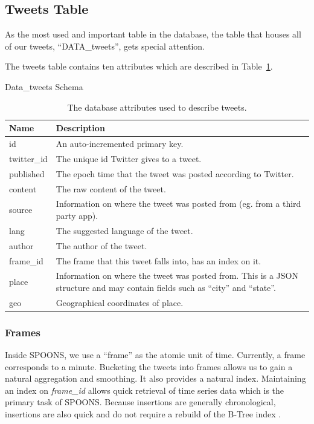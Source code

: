 \documentclass[12pt]{ucthesis}
\begin{document}
\subsection{Tweets Table}
\label{arch-database-tables-tweets}
As the most used and important table in the database, the table that houses all of our tweets, ``DATA\_tweets'', gets special attention.

The tweets table contains ten attributes which are described in Table~\ref{table:tweet-attributes}.

\begin{table}
   \begin{center}
      {\Large Data\_tweets Schema}
      \begin{tabular}{|l|p{12cm}|}
         \hline
            Name & Description
         \tabularnewline\hline
            \textsf{id} & An auto-incremented primary key.
         \tabularnewline\hline
            \textsf{twitter\_id} & The unique id Twitter gives to a tweet.
         \tabularnewline\hline
            \textsf{published} & The epoch time that the tweet was posted according to Twitter.
         \tabularnewline\hline
            \textsf{content} & The raw content of the tweet.
         \tabularnewline\hline
            \textsf{source} & Information on where the tweet was posted from (eg. from a third party app).
         \tabularnewline\hline
            \textsf{lang} & The suggested language of the tweet.
         \tabularnewline\hline
            \textsf{author} & The author of the tweet.
         \tabularnewline\hline
            \textsf{frame\_id} & The frame that this tweet falls into, has an index on it.
         \tabularnewline\hline
            \textsf{place} & Information on where the tweet was posted from. This is a JSON structure and may contain fields such as ``city'' and ``state''.
         \tabularnewline\hline
            \textsf{geo} & Geographical coordinates of place.
         \tabularnewline\hline
      \end{tabular}
   \end{center}
   \caption[Database Tweet Attributes]{The database attributes used to describe tweets.}
   \label{table:tweet-attributes}
\end{table}

\subsubsection{Frames}
Inside SPOONS, we use a ``frame'' as the atomic unit of time. Currently, a frame corresponds to a minute. Bucketing the tweets into frames allows us to
gain a natural aggregation and smoothing. It also provides a natural index. Maintaining an index on \textit{frame\_id} allows quick retrieval of
time series data which is the primary task of SPOONS. Because insertions are generally chronological, insertions are also quick and do not require a
rebuild of the B-Tree index \cite{innodb}.
\end{document}
